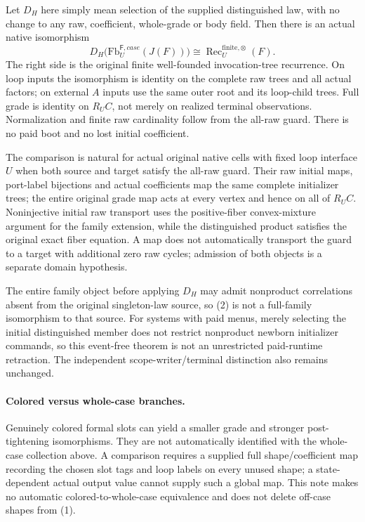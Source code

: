 \documentclass[11pt]{article}
\begin{document}
Let $D_H$ here simply mean selection of the supplied distinguished law, with no change to any raw, coefficient, whole-grade or body field. Then there is an actual native isomorphism
\[
 D_H\bigl(\mathrm{Fb}^{\mathsf F,case}_U(J(F))\bigr)
 \cong \operatorname{Rec}^{\mathrm{finite},\otimes}_U(F). \tag{2}
\]
The right side is the original finite well-founded invocation-tree recurrence. On loop inputs the isomorphism is identity on the complete raw trees and all actual factors; on external $A$ inputs use the same outer root and its loop-child trees. Full grade is identity on $R_UC$, not merely on realized terminal observations. Normalization and finite raw cardinality follow from the all-raw guard. There is no paid boot and no lost initial coefficient.

The comparison is natural for actual original native cells with fixed loop interface $U$ when both source and target satisfy the all-raw guard. Their raw initial maps, port-label bijections and actual coefficients map the same complete initializer trees; the entire original grade map acts at every vertex and hence on all of $R_UC$. Noninjective initial raw transport uses the positive-fiber convex-mixture argument for the family extension, while the distinguished product satisfies the original exact fiber equation. A map does not automatically transport the guard to a target with additional zero raw cycles; admission of both objects is a separate domain hypothesis.

The entire family object before applying $D_H$ may admit nonproduct correlations absent from the original singleton-law source, so (2) is not a full-family isomorphism to that source. For systems with paid menus, merely selecting the initial distinguished member does not restrict nonproduct newborn initializer commands, so this event-free theorem is not an unrestricted paid-runtime retraction. The independent scope-writer/terminal distinction also remains unchanged.

\paragraph{Colored versus whole-case branches.} Genuinely colored formal slots can yield a smaller grade and stronger post-tightening isomorphisms. They are not automatically identified with the whole-case collection above. A comparison requires a supplied full shape/coefficient map recording the chosen slot tags and loop labels on every unused shape; a state-dependent actual output value cannot supply such a global map. This note makes no automatic colored-to-whole-case equivalence and does not delete off-case shapes from (1).
\end{document}
